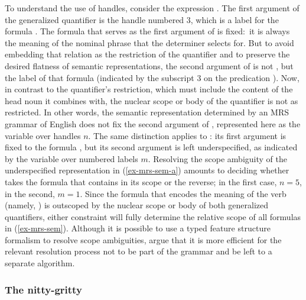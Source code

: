 \documentclass[output=paper
	        ,collection
	        ,collectionchapter
 	        ,biblatex
                ,babelshorthands
                ,newtxmath
                ,draftmode
                ,colorlinks, citecolor=brown
]{langscibook}
\begin{document}
To understand the use of handles, consider the expression . The first argument of the generalized quantifier is the handle numbered 3, which is a label for the formula . The formula that serves as the first argument of  is fixed:\ it is always the meaning of the nominal phrase that the determiner selects for. But to avoid embedding that relation as the restriction of the quantifier and to preserve the desired flatness of semantic representations, the second argument of  is not , but the label of that formula (indicated by the subscript $3$ on the predication ). Now, in contrast to the quantifier's restriction, which must include the content of the head noun it combines with, the nuclear scope or body of the quantifier is not as restricted. In other words, the semantic representation determined by an MRS grammar of English does not fix the second argument of , represented here as the variable over handles $n$. The same distinction applies to : its first argument is fixed to the formula , but its second argument is left underspecified, as indicated by the variable over numbered labels $m$. Resolving the scope ambiguity of the underspecified representation in (\ref{ex-mrs-sem-a}) amounts to deciding whether  takes the formula that contains  in its scope or the reverse; in the first case, $n=5$, in the second, $m=1$. Since the formula that encodes the meaning of the verb (namely, \mbox{)} is outscoped by the nuclear scope or body of both generalized quantifiers, either constraint will fully determine the relative scope of all formulas in (\ref{ex-mrs-sem}). Although it is possible to use a typed feature structure formalism to resolve scope ambiguities, \citet[309--311]{Copestakeetal1995} argue that it is more efficient for the relevant resolution process not to be part of the grammar and be left to a separate algorithm.



\subsubsection{The nitty-gritty}
\end{document}
